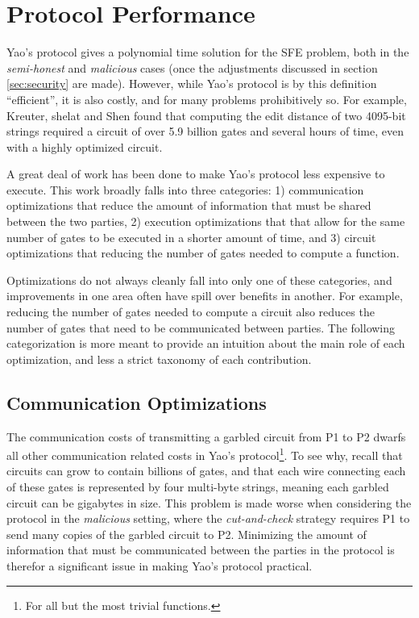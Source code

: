 \section{Protocol Performance}
\label{sec:performance}

Yao's protocol gives a polynomial time solution for the \ac{SFE} problem, both in the \emph{semi-honest} and \emph{malicious} cases (once the adjustments discussed in section \ref{sec:security} are made).  However, while Yao's protocol is by this definition ``efficient'', it is also costly, and for many problems prohibitively so.  For example, Kreuter, shelat and Shen\cite{kreuter2012billion} found that computing the edit distance of two 4095-bit strings required a circuit of over 5.9 billion gates and several hours of time, even with a highly optimized circuit.

A great deal of work has been done to make Yao's protocol less expensive to execute.  This work broadly falls into three categories: 1) communication optimizations that reduce the amount of information that must be shared between the two parties, 2) execution optimizations that that allow for the same number of gates to be executed in a shorter amount of time, and 3) circuit optimizations that reducing the number of gates needed to compute a function.

Optimizations do not always cleanly fall into only one of these categories, and improvements in one area often have spill over benefits in another.  For example, reducing the number of gates needed to compute a circuit also reduces the number of gates that need to be communicated between parties.  The following categorization is more meant to provide an intuition about the main role of each optimization, and less a strict taxonomy of each contribution.


\subsection{Communication Optimizations}

The communication costs of transmitting a garbled circuit from \ac{P1} to \ac{P2} dwarfs all other communication related costs in Yao's protocol\footnote{For all but the most trivial functions.}.  To see why, recall that circuits can grow to contain billions of gates, and that each wire connecting each of these gates is represented by four multi-byte strings, meaning each garbled circuit can be gigabytes in size. This problem is made worse when considering the protocol in the \emph{malicious} setting, where the \emph{cut-and-check} strategy requires \ac{P1} to send many copies of the garbled circuit to \ac{P2}. Minimizing the amount of information that must be communicated between the parties in the protocol is therefor a significant issue in making Yao's protocol practical.

